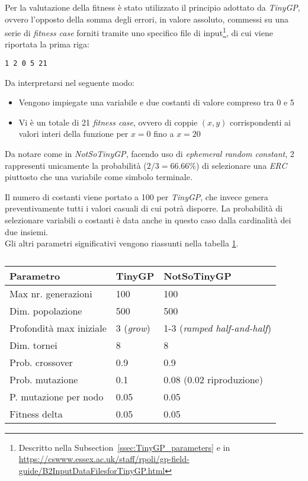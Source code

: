 \documentclass{../llncs}
\newcommand{\xss}[1]{\subsectionname~\ref{ssec:#1}}
\newcommand{\subsectionname}{Subsection}
\begin{document}
Per la valutazione della fitness è stato utilizzato il principio adottato da \emph{TinyGP}, ovvero l'opposto della somma degli errori, in valore assoluto, commessi su una serie di \emph{fitness case} forniti tramite uno specifico file di input\footnote{Descritto nella \xss{TinyGP_parameters} e in \url{https://cswww.essex.ac.uk/staff/rpoli/gp-field-guide/B2InputDataFilesforTinyGP.html}}, di cui viene riportata la prima riga:
\begin{lstlisting}[caption={Prima riga di \texttt{/NotSoTinyGP/resources/polynomial-data.txt}}]
1 2 0 5 21
\end{lstlisting}

\noindent Da interpretarsi nel seguente modo:
\begin{itemize}
\item Vengono impiegate una variabile e due costanti di valore compreso tra 0 e 5
\item Vi è un totale di 21 \emph{fitness case}, ovvero di coppie $(x ,y)$ corrispondenti ai valori interi della funzione per $x=0$ fino a $x=20$
\end{itemize}

Da notare come in \emph{NotSoTinyGP}, facendo uso di \emph{ephemeral random constant}, 2 rappresenti unicamente la probabilità ($2/3=66.66\%$) di selezionare una \emph{ERC} piuttosto che una variabile come simbolo terminale.

Il numero di costanti viene portato a 100 per \emph{TinyGP}, che invece genera preventivamente tutti i valori casuali di cui potrà disporre. La probabilità di selezionare variabili o costanti è data anche in questo caso dalla cardinalità dei due insiemi.\\

\noindent Gli altri parametri significativi vengono riassunti nella tabella \ref{tablePolynomialParams}.\\

\begin{table}
\begin{tabular}{l | p{2.7cm} | p{4.3cm}}
\textbf{Parametro}			& \textbf{TinyGP}	& \textbf{NotSoTinyGP}				\\ \hline
Max nr. generazioni			& 100 				& 100 								\\ \hline
Dim. popolazione			& 500 				& 500 								\\ \hline 
Profondità max iniziale		& 3 (\emph{grow}) 	& 1-3 (\emph{ramped half-and-half})	\\ \hline
Dim. tornei 				& 8 				& 8									\\ \hline
Prob. crossover 			& 0.9 				& 0.9 								\\ \hline
Prob. mutazione 			& 0.1 				& 0.08 (0.02 riproduzione)			\\ \hline
P. mutazione per nodo 		& 0.05 				& 0.05 								\\ \hline
Fitness delta 				& 0.05 				& 0.05 								\\
\end{tabular}
\caption{} \label{tablePolynomialParams}
\end{table}
\end{document}
